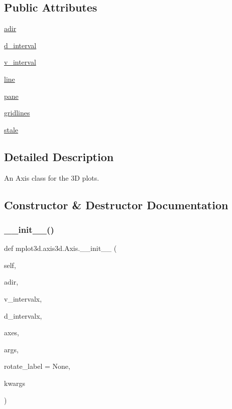 \subsection*{Public Attributes}
\begin{DoxyCompactItemize}
\item 
\hyperlink{classmplot3d_1_1axis3d_1_1Axis_aae6bffe311acc83fe49d3b49300ffc01}{adir}
\item 
\hyperlink{classmplot3d_1_1axis3d_1_1Axis_a8ea8039b7630a707f7765508b61f5d39}{d\+\_\+interval}
\item 
\hyperlink{classmplot3d_1_1axis3d_1_1Axis_a2c27a19dc4fede5e28755084a71e6fea}{v\+\_\+interval}
\item 
\hyperlink{classmplot3d_1_1axis3d_1_1Axis_a74acf5949810f8698ba60f918eb62edc}{line}
\item 
\hyperlink{classmplot3d_1_1axis3d_1_1Axis_a440cd41a85008f44be87f4d951a53415}{pane}
\item 
\hyperlink{classmplot3d_1_1axis3d_1_1Axis_abf4e45176b74c887b3b83d2543d7a394}{gridlines}
\item 
\hyperlink{classmplot3d_1_1axis3d_1_1Axis_a70e3e7d197d9846bba96859e86b0f5bc}{stale}
\end{DoxyCompactItemize}


\subsection{Detailed Description}
\begin{DoxyVerb}An Axis class for the 3D plots.\end{DoxyVerb}
 

\subsection{Constructor \& Destructor Documentation}
\mbox{\label{classmplot3d_1_1axis3d_1_1Axis_a85ededf2f2848bf07f9f13fffc21d11b}} 
\subsubsection{\texorpdfstring{\+\_\+\+\_\+init\+\_\+\+\_\+()}{\_\_init\_\_()}}
{\footnotesize\ttfamily def mplot3d.\+axis3d.\+Axis.\+\_\+\+\_\+init\+\_\+\+\_\+ (\begin{DoxyParamCaption}\item[{}]{self,  }\item[{}]{adir,  }\item[{}]{v\+\_\+intervalx,  }\item[{}]{d\+\_\+intervalx,  }\item[{}]{axes,  }\item[{}]{args,  }\item[{}]{rotate\+\_\+label = {\ttfamily None},  }\item[{}]{kwargs }\end{DoxyParamCaption})}



